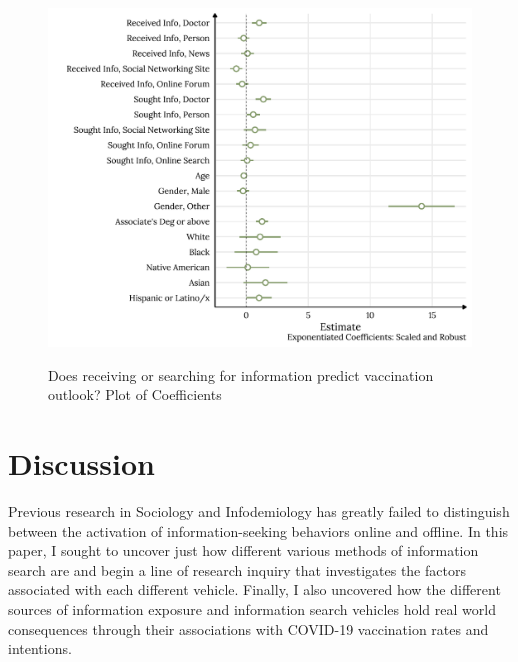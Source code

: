 \begin{figure}[h]
{\centering \includegraphics[width=0.8\linewidth]{figs/paper2/plot-model-3-1}}
\caption{Does receiving or searching for information predict vaccination outlook? Plot of Coefficients}\label{fig:plot-model-3}
\end{figure}

\hypertarget{discussion}{%
\section{Discussion}\label{discussion}}

Previous research in Sociology and Infodemiology has greatly failed to
distinguish between the activation of information-seeking behaviors online and
offline. In this paper, I sought to uncover just how different various methods of
information search are and begin a line of research inquiry that investigates
the factors associated with each different vehicle. Finally, I also uncovered
how the different sources of information exposure and information search
vehicles hold real world consequences through their associations with COVID-19
vaccination rates and intentions.

